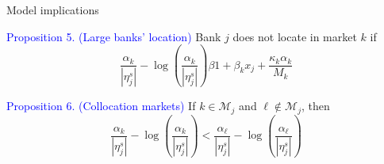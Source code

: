 \documentclass[notes,10pt, aspectratio=169]{beamer}
\newenvironment{wideitemize}{\itemize\addtolength{\itemsep}{10pt}}{\enditemize}
\begin{document}
\begin{frame}{Model implications}
            
    \begin{wideitemize}

        \item \textcolor{blue}{Proposition 5. (Large banks' location)} Bank $j$ does not locate in market $k$ if
        $$
        \frac{\alpha_k}{\left|\eta_j^s\right|}-\log \left(\frac{\alpha_k}{\left|\eta_j^s\right|}\right) \beta 1+\beta_k x_j+\frac{\kappa_k \alpha_k}{M_k}
        $$
        \item \textcolor{blue}{Proposition 6. (Collocation markets)} If $k \in \mathcal{M}_j$ and $\ell \notin \mathcal{M}_j$, then 
        $$
        \frac{\alpha_k}{\left|\eta_j^s\right|}-\log \left(\frac{\alpha_k}{\left|\eta_j^s\right|}\right)<\frac{\alpha_{\ell}}{\left|\eta_j^s\right|}-\log \left(\frac{\alpha_{\ell}}{\left|\eta_j^s\right|}\right)
        $$
    \end{wideitemize}
    \end{frame}

    
    
    
    
    
    
\end{document}
